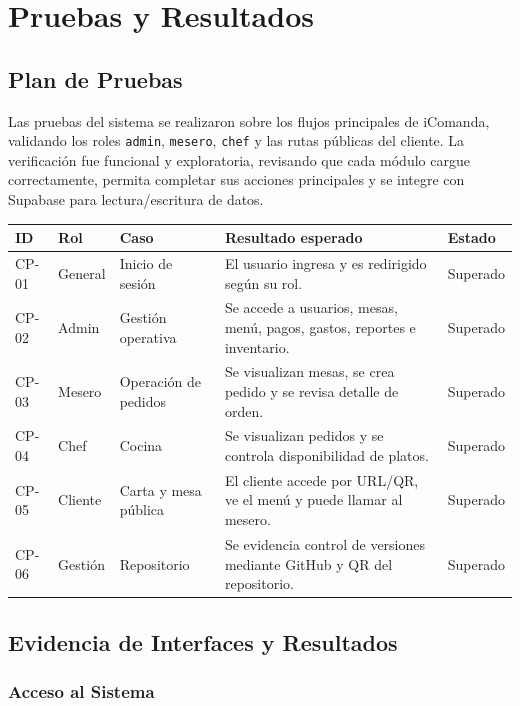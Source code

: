 \chapter{Pruebas y Resultados}

\section{Plan de Pruebas}

Las pruebas del sistema se realizaron sobre los flujos principales de iComanda,
validando los roles \texttt{admin}, \texttt{mesero}, \texttt{chef} y las rutas
públicas del cliente. La verificación fue funcional y exploratoria, revisando que
cada módulo cargue correctamente, permita completar sus acciones principales y se
integre con Supabase para lectura/escritura de datos.

\begin{center}
\renewcommand{\arraystretch}{1.25}
\small
\begin{tabular}{|p{1.4cm}|p{2cm}|p{4.2cm}|p{4.6cm}|p{1.8cm}|}
\hline
\textbf{ID} & \textbf{Rol} & \textbf{Caso} & \textbf{Resultado esperado} & \textbf{Estado} \\
\hline
CP-01 & General & Inicio de sesión & El usuario ingresa y es redirigido según su rol. & Superado \\
\hline
CP-02 & Admin & Gestión operativa & Se accede a usuarios, mesas, menú, pagos, gastos, reportes e inventario. & Superado \\
\hline
CP-03 & Mesero & Operación de pedidos & Se visualizan mesas, se crea pedido y se revisa detalle de orden. & Superado \\
\hline
CP-04 & Chef & Cocina & Se visualizan pedidos y se controla disponibilidad de platos. & Superado \\
\hline
CP-05 & Cliente & Carta y mesa pública & El cliente accede por URL/QR, ve el menú y puede llamar al mesero. & Superado \\
\hline
CP-06 & Gestión & Repositorio & Se evidencia control de versiones mediante GitHub y QR del repositorio. & Superado \\
\hline
\end{tabular}
\end{center}

\section{Evidencia de Interfaces y Resultados}

\subsection{Acceso al Sistema}

